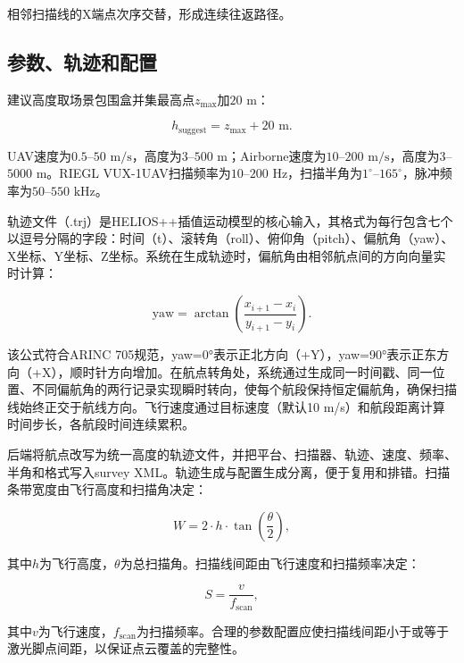\documentclass[a4paper,fleqn]{cas-sc}
\begin{document}
相邻扫描线的X端点次序交替，形成连续往返路径。

\subsection{参数、轨迹和配置}

建议高度取场景包围盒并集最高点$z_{\max}$加$20\text{ m}$：

\begin{equation}
    h_{\text{suggest}} = z_{\max} + 20\text{ m}.
\end{equation}

UAV速度为$0.5$--$50\text{ m/s}$，高度为$3$--$500\text{ m}$；Airborne速度为$10$--$200\text{ m/s}$，高度为$3$--$5000\text{ m}$。RIEGL VUX-1UAV扫描频率为$10$--$200\text{ Hz}$，扫描半角为$1^\circ$--$165^\circ$，脉冲频率为$50$--$550\text{ kHz}$。

轨迹文件（.trj）是HELIOS++插值运动模型的核心输入，其格式为每行包含七个以逗号分隔的字段：时间（t）、滚转角（roll）、俯仰角（pitch）、偏航角（yaw）、X坐标、Y坐标、Z坐标。系统在生成轨迹时，偏航角由相邻航点间的方向向量实时计算：

\begin{equation}
    \text{yaw} = \arctan\left(\frac{x_{i+1} - x_i}{y_{i+1} - y_i}\right).
\end{equation}

该公式符合ARINC 705规范，yaw=0°表示正北方向（+Y），yaw=90°表示正东方向（+X），顺时针方向增加。在航点转角处，系统通过生成同一时间戳、同一位置、不同偏航角的两行记录实现瞬时转向，使每个航段保持恒定偏航角，确保扫描线始终正交于航线方向。飞行速度通过目标速度（默认10 m/s）和航段距离计算时间步长，各航段时间连续累积。

后端将航点改写为统一高度的轨迹文件，并把平台、扫描器、轨迹、速度、频率、半角和格式写入survey XML。轨迹生成与配置生成分离，便于复用和排错。扫描条带宽度由飞行高度和扫描角决定：

\begin{equation}
    W = 2 \cdot h \cdot \tan\left(\frac{\theta}{2}\right),
\end{equation}

其中$h$为飞行高度，$\theta$为总扫描角。扫描线间距由飞行速度和扫描频率决定：

\begin{equation}
    S = \frac{v}{f_{\text{scan}}},
\end{equation}

其中$v$为飞行速度，$f_{\text{scan}}$为扫描频率。合理的参数配置应使扫描线间距小于或等于激光脚点间距，以保证点云覆盖的完整性。
\end{document}
